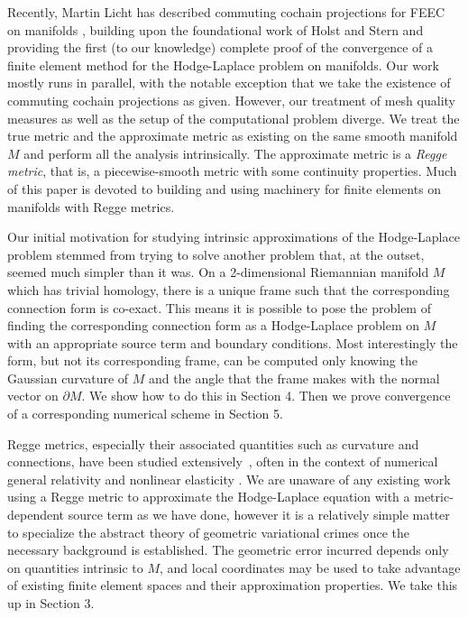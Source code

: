 \documentclass[11pt]{article}
\newcommand{\correction}[2]{\textcolor{red}{}\textcolor{black}{#2}}
\begin{document}
Recently, Martin Licht has described commuting cochain projections for FEEC on manifolds \cite{Licht}, building upon the foundational work of Holst and Stern \cite{Holst-Stern} and providing the first (to our knowledge) complete proof of the convergence of a finite element method for the Hodge-Laplace problem on manifolds. Our work mostly runs in parallel, with the notable exception that we take the existence of commuting cochain projections as given. However, our treatment of mesh quality measures as well as the setup of the computational problem diverge. We treat the true metric and the approximate metric as existing on the same smooth manifold $M$ and perform all the analysis intrinsically. The approximate metric is a \emph{Regge metric}, that is, a piecewise-smooth metric with some continuity properties. Much of this paper is devoted to building and using machinery for finite elements on manifolds with Regge metrics.

Our initial motivation for studying intrinsic approximations of the Hodge-Laplace problem stemmed from trying to solve another problem that, at the outset, seemed much simpler than it was. 
On a 2-dimensional Riemannian manifold $M$ which has trivial homology, there is a unique frame such that the corresponding connection form is co-exact. This means it is possible to pose the problem of finding the corresponding connection form as a Hodge-Laplace problem on $M$ with an appropriate source term and boundary conditions. Most interestingly the form, but not its corresponding frame, can be computed only knowing the Gaussian curvature of $M$ and the angle that the frame makes with the normal vector on $\partial M$.  We show how to do this in Section 4. Then we prove convergence of a corresponding numerical scheme in Section 5.

Regge metrics, especially their associated quantities such as curvature and connections, have been studied extensively~\cite{cheeger1984curvature,christiansen2024definition,gawlik2020high,BKGa22,gopalakrishnan2022analysis,GaNe22,gawlik2023finite,gopalakrishnan2023analysis,gopalakrishnan2024improved}, often in the context of numerical general relativity and nonlinear elasticity \cite{Regge,christiansen2011linearization,Li,neunteufel2021avoiding}. We are unaware of any existing work using a Regge metric to approximate the Hodge-Laplace equation with a metric-dependent source term as we have done\correction{ (although Regge calculus has been used for discrete approximations of the Laplacian in the physics literature \cite{Calcagni_2013})}{}, however it is a relatively simple matter to specialize the abstract theory of geometric variational crimes once the necessary background is established. The geometric error incurred depends only on quantities intrinsic to $M$, and local coordinates may be used to take advantage of existing finite element spaces and their approximation properties. We take this up in Section 3.
\end{document}
